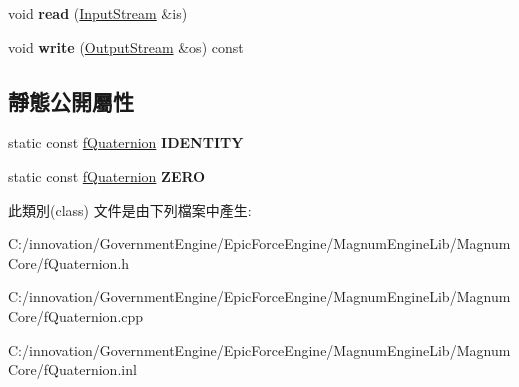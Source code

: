 \begin{DoxyCompactItemize}
\item 
void {\bfseries read} (\hyperlink{class_i_dream_sky_1_1_input_stream}{Input\+Stream} \&is)\hypertarget{class_i_dream_sky_1_1f_quaternion_a783d736b3bef3802584e632aa61d7c18}{}\label{class_i_dream_sky_1_1f_quaternion_a783d736b3bef3802584e632aa61d7c18}

\item 
void {\bfseries write} (\hyperlink{class_i_dream_sky_1_1_output_stream}{Output\+Stream} \&os) const \hypertarget{class_i_dream_sky_1_1f_quaternion_a4117e7550bae136a9f159fbf95a1a714}{}\label{class_i_dream_sky_1_1f_quaternion_a4117e7550bae136a9f159fbf95a1a714}

\end{DoxyCompactItemize}
\subsection*{靜態公開屬性}
\begin{DoxyCompactItemize}
\item 
static const \hyperlink{class_i_dream_sky_1_1f_quaternion}{f\+Quaternion} {\bfseries I\+D\+E\+N\+T\+I\+TY}\hypertarget{class_i_dream_sky_1_1f_quaternion_a6535b0ef241ea0eb57a50feb0b72cffa}{}\label{class_i_dream_sky_1_1f_quaternion_a6535b0ef241ea0eb57a50feb0b72cffa}

\item 
static const \hyperlink{class_i_dream_sky_1_1f_quaternion}{f\+Quaternion} {\bfseries Z\+E\+RO}\hypertarget{class_i_dream_sky_1_1f_quaternion_a3fcd7a764544b9d59eb3913aab062dee}{}\label{class_i_dream_sky_1_1f_quaternion_a3fcd7a764544b9d59eb3913aab062dee}

\end{DoxyCompactItemize}


此類別(class) 文件是由下列檔案中產生\+:\begin{DoxyCompactItemize}
\item 
C\+:/innovation/\+Government\+Engine/\+Epic\+Force\+Engine/\+Magnum\+Engine\+Lib/\+Magnum\+Core/f\+Quaternion.\+h\item 
C\+:/innovation/\+Government\+Engine/\+Epic\+Force\+Engine/\+Magnum\+Engine\+Lib/\+Magnum\+Core/f\+Quaternion.\+cpp\item 
C\+:/innovation/\+Government\+Engine/\+Epic\+Force\+Engine/\+Magnum\+Engine\+Lib/\+Magnum\+Core/f\+Quaternion.\+inl\end{DoxyCompactItemize}
